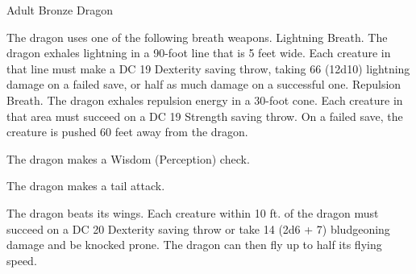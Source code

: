 \begin{monsterbox}{Adult Bronze Dragon}
\begin{monsteraction}
\end{monsteraction}
\begin{monsteraction}
The dragon uses one of the following breath weapons.
Lightning Breath. The dragon exhales lightning in a 90-foot line that is 5 feet wide. Each creature in that line must make a DC 19 Dexterity saving throw, taking 66 (12d10) lightning damage on a failed save, or half as much damage on a successful one.
Repulsion Breath. The dragon exhales repulsion energy in a 30-foot cone. Each creature in that area must succeed on a DC 19 Strength saving throw. On a failed save, the creature is pushed 60 feet away from the dragon.
\end{monsteraction}
\begin{monsteraction}[Detect]
The dragon makes a Wisdom (Perception) check.
\end{monsteraction}
\begin{monsteraction}
The dragon makes a tail attack.
\end{monsteraction}
\begin{monsteraction}
The dragon beats its wings. Each creature within 10 ft. of the dragon must succeed on a DC 20 Dexterity saving throw or take 14 (2d6 + 7) bludgeoning damage and be knocked prone. The dragon can then fly up to half its flying speed.
\end{monsteraction}
\end{monsterbox}